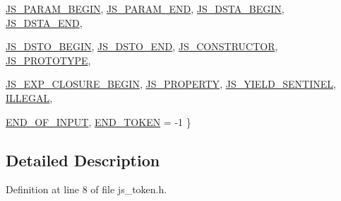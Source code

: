 \begin{DoxyCompactItemize}
\par
\hyperlink{classmocha_1_1_token_ad91b4584085a00e1cfe54b275a2c466aac3074154f0e6ec739db3ab5661d0f1af}{JS\_\-PARAM\_\-BEGIN}, 
\hyperlink{classmocha_1_1_token_ad91b4584085a00e1cfe54b275a2c466aa990ea31522b165d66c3f7b15a9d9e0e7}{JS\_\-PARAM\_\-END}, 
\hyperlink{classmocha_1_1_token_ad91b4584085a00e1cfe54b275a2c466aa4e2aba23b591a31525e91733e838fd3b}{JS\_\-DSTA\_\-BEGIN}, 
\hyperlink{classmocha_1_1_token_ad91b4584085a00e1cfe54b275a2c466aab6c61e798367bc3ddde0b8c1ca8287a8}{JS\_\-DSTA\_\-END}, 
\par
\hyperlink{classmocha_1_1_token_ad91b4584085a00e1cfe54b275a2c466aa16992b77b20ad8ed9a26adf3fd8c0f11}{JS\_\-DSTO\_\-BEGIN}, 
\hyperlink{classmocha_1_1_token_ad91b4584085a00e1cfe54b275a2c466aaf1897c013a74a2c7fe643bb24970f391}{JS\_\-DSTO\_\-END}, 
\hyperlink{classmocha_1_1_token_ad91b4584085a00e1cfe54b275a2c466aa19f065711c7d24d738e4fc7d0ee71d19}{JS\_\-CONSTRUCTOR}, 
\hyperlink{classmocha_1_1_token_ad91b4584085a00e1cfe54b275a2c466aa12a289215940f9d96c76dce24d5012b4}{JS\_\-PROTOTYPE}, 
\par
\hyperlink{classmocha_1_1_token_ad91b4584085a00e1cfe54b275a2c466aa392166dd6fa842ba2a5ace6a599103ed}{JS\_\-EXP\_\-CLOSURE\_\-BEGIN}, 
\hyperlink{classmocha_1_1_token_ad91b4584085a00e1cfe54b275a2c466aae4fb4d955f873ddd766effe60c77e681}{JS\_\-PROPERTY}, 
\hyperlink{classmocha_1_1_token_ad91b4584085a00e1cfe54b275a2c466aa02f16adedb5f89f9a55405fa1b988164}{JS\_\-YIELD\_\-SENTINEL}, 
\hyperlink{classmocha_1_1_token_ad91b4584085a00e1cfe54b275a2c466aaa07dfc6e6fd0ea7dbaed72f8b95d5bba}{ILLEGAL}, 
\par
\hyperlink{classmocha_1_1_token_ad91b4584085a00e1cfe54b275a2c466aa1adcb3930b3ff7ec2e9b3ae6bf2d9092}{END\_\-OF\_\-INPUT}, 
\hyperlink{classmocha_1_1_token_ad91b4584085a00e1cfe54b275a2c466aae125ccae9fbdbd259a04c7c5c4beff64}{END\_\-TOKEN} =  -\/1
 \}
\end{DoxyCompactItemize}


\subsection{Detailed Description}


Definition at line 8 of file js\_\-token.h.



